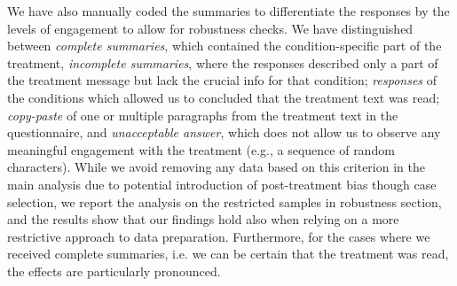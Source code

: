 \documentclass[11pt, ngerman,english,a4]{article}
\begin{document}

We have also manually coded the summaries to differentiate the responses by the levels of engagement to allow for robustness checks. We have distinguished between \textit{complete summaries}, which contained the condition-specific part of the treatment, \textit{incomplete summaries}, where the responses described only a part of the treatment message but lack the crucial info for that condition;  \textit{responses} of the conditions which allowed us to concluded that the treatment text was read; \textit{copy-paste} of one or multiple paragraphs from the treatment text in the questionnaire, and \textit{unacceptable answer}, which does not allow us to observe any meaningful engagement with the treatment (e.g., a sequence of random characters). While we avoid removing any data based on this criterion in the main analysis due to potential introduction of post-treatment bias though case selection, we report the analysis on the restricted samples in robustness section, and the results show that our findings hold also when relying on a more restrictive approach to data preparation. Furthermore, for the cases where we received complete summaries, i.e. we can be certain that the treatment was read, the effects are particularly pronounced. 


\end{document}
